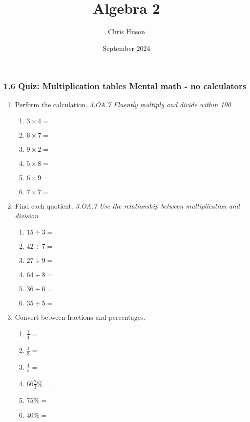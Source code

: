 \documentclass[12pt, twoside]{article}
\title{Algebra 2}
\author{Chris Huson}
\date{September 2024}
\begin{document}
\subsubsection*{1.6 Quiz: Multiplication tables \hfill Mental math - no calculators}
\begin{enumerate}[itemsep=0.5cm]

\item Perform the calculation. \hfill \emph{3.OA.7 Fluently multiply and divide within 100}
    \begin{multicols}{2}
        \begin{enumerate}[itemsep=0.5cm]
            \item $3 \times 4 =$
            \item $6 \times 7 =$
            \item $9 \times 2 =$
            \item $5 \times 8 =$
            \item $6 \times 9 =$
            \item $7 \times 7 =$
        \end{enumerate}
    \end{multicols}

\item Find each quotient. \hfill \emph{3.OA.7 Use the relationship between multiplication and division}
    \begin{multicols}{2}
        \begin{enumerate}[itemsep=0.5cm]
            \item $15 \div 3 =$
            \item $42 \div 7 =$
            \item $27 \div 9 =$
            \item $64 \div 8 =$
            \item $36 \div 6 =$
            \item $35 \div 5 =$
        \end{enumerate}
    \end{multicols}

\item Convert between fractions and percentages.
\begin{multicols}{2}
\begin{enumerate}[itemsep=0.5cm]
    \item $\frac{1}{4}=$
    \item $\frac{1}{3}=$
    \item $\frac{4}{5}=$
    \item $66 \frac{2}{3}\% =$
    \item $75\% =$
    \item $40\% =$
\end{enumerate}
\end{multicols}


\end{enumerate}
\end{document}
